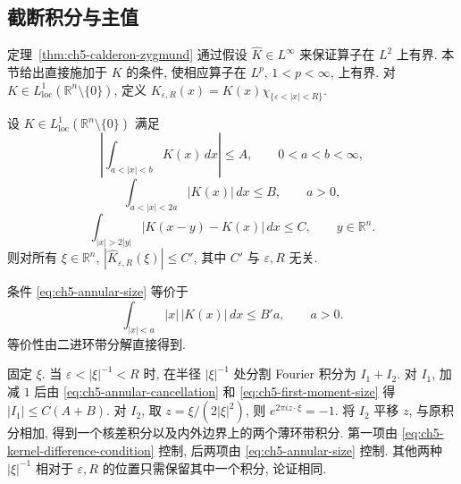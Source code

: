 \subsection{截断积分与主值}
\label{sec:ch5-truncated-integrals-principal-value}

定理~\ref{thm:ch5-calderon-zygmund} 通过假设 $\widehat K\in L^\infty$ 来保证算子在 $L^2$ 上有界. 本节给出直接施加于 $K$ 的条件, 使相应算子在 $L^p$, $1<p<\infty$, 上有界. 对 $K\in L^1_{\mathrm{loc}}(\mathbb R^n\setminus\{0\})$, 定义 $K_{\varepsilon,R}(x)=K(x)\chi_{\{\varepsilon<|x|<R\}}$.

\begin{Proposition}
\label{prop:ch5-truncated-kernel-fourier-bound}
设 $K\in L^1_{\mathrm{loc}}(\mathbb R^n\setminus\{0\})$ 满足
\begin{equation}
\label{eq:ch5-annular-cancellation}
 \left|\int_{a<|x|<b}K(x)\,dx\right|\le A,
 \qquad 0<a<b<\infty,
\end{equation}
\begin{equation}
\label{eq:ch5-annular-size}
 \int_{a<|x|<2a}|K(x)|\,dx\le B,
 \qquad a>0,
\end{equation}
\begin{equation}
\label{eq:ch5-kernel-difference-condition}
 \int_{|x|>2|y|}|K(x-y)-K(x)|\,dx\le C,
 \qquad y\in\mathbb R^n.
\end{equation}
则对所有 $\xi\in\mathbb R^n$, $|\widehat K_{\varepsilon,R}(\xi)|\le C'$, 其中 $C'$ 与 $\varepsilon,R$ 无关.
\end{Proposition}

条件 \eqref{eq:ch5-annular-size} 等价于
\begin{equation}
\label{eq:ch5-first-moment-size}
 \int_{|x|<a}|x|\,|K(x)|\,dx\le B'a,
 \qquad a>0.
\end{equation}
等价性由二进环带分解直接得到.

\begin{Proof}
固定 $\xi$. 当 $\varepsilon<|\xi|^{-1}<R$ 时, 在半径 $|\xi|^{-1}$ 处分割 Fourier 积分为 $I_1+I_2$. 对 $I_1$, 加减 $1$ 后由 \eqref{eq:ch5-annular-cancellation} 和 \eqref{eq:ch5-first-moment-size} 得 $|I_1|\le C(A+B)$. 对 $I_2$, 取 $z=\xi/(2|\xi|^2)$, 则 $e^{2\pi iz\cdot\xi}=-1$. 将 $I_2$ 平移 $z$, 与原积分相加, 得到一个核差积分以及内外边界上的两个薄环带积分. 第一项由 \eqref{eq:ch5-kernel-difference-condition} 控制, 后两项由 \eqref{eq:ch5-annular-size} 控制. 其他两种 $|\xi|^{-1}$ 相对于 $\varepsilon,R$ 的位置只需保留其中一个积分, 论证相同.
\end{Proof}

